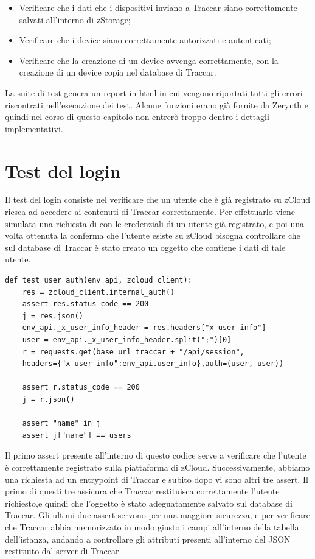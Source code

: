 \documentclass[a4paper,titlepage,12pt]{report}
\begin{document}
{\begin{itemize}
\item Verificare che i dati che i dispositivi inviano a Traccar siano correttamente salvati all'interno di zStorage;

\item Verificare che i device siano correttamente autorizzati e autenticati;

\item Verificare che la creazione di un device avvenga correttamente, con la creazione di un device copia nel database di Traccar.
\end{itemize}

La suite di test genera un report in html in cui vengono riportati tutti gli errori riscontrati nell'esecuzione dei test. Alcune funzioni erano già fornite da Zerynth e quindi nel corso di questo capitolo non entrerò troppo dentro i dettagli implementativi.

\section{
Test del login}
Il test del login consiste nel verificare che un utente che è già registrato su zCloud riesca ad accedere ai contenuti di Traccar correttamente. Per effettuarlo viene simulata una richiesta di con le credenziali di un utente già registrato, e poi una volta ottenuta la conferma che l'utente esiste su zCloud bisogna controllare che sul database di Traccar è stato creato un oggetto che contiene i dati di tale utente.

\begin{verbatim}
def test_user_auth(env_api, zcloud_client):
    res = zcloud_client.internal_auth()
    assert res.status_code == 200
    j = res.json()
    env_api._x_user_info_header = res.headers["x-user-info"]
    user = env_api._x_user_info_header.split(";")[0]
    r = requests.get(base_url_traccar + "/api/session", 
    headers={"x-user-info":env_api.user_info},auth=(user, user))
    
    assert r.status_code == 200
    j = r.json()

    assert "name" in j
    assert j["name"] == users
\end{verbatim}

\noindent Il primo assert presente all'interno di questo codice serve a verificare che l'utente è correttamente registrato sulla piattaforma di zCloud. Successivamente, abbiamo una richiesta ad un entrypoint di Traccar e subito dopo vi sono altri tre assert. Il primo di questi tre assicura che Traccar restituisca correttamente l'utente richiesto,e quindi che l'oggetto è stato adeguatamente salvato sul database di Traccar. Gli ultimi due assert servono per una maggiore sicurezza, e per verificare che Traccar abbia memorizzato in modo giusto i campi all'interno della tabella dell'istanza, andando a controllare gli attributi presenti all'interno del JSON restituito dal server di Traccar.


}
\end{document}
